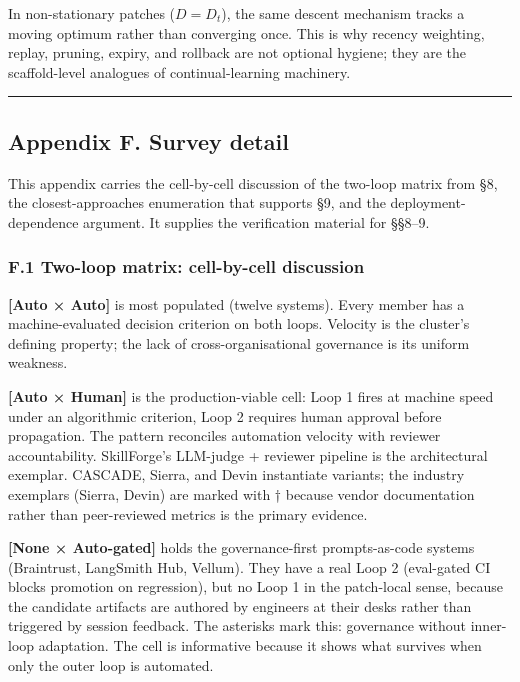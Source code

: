 In non-stationary patches (\(D = D_t\)), the same descent mechanism
tracks a moving optimum rather than converging once. This is why recency
weighting, replay, pruning, expiry, and rollback are not optional
hygiene; they are the scaffold-level analogues of continual-learning
machinery.

\begin{center}\rule{0.5\linewidth}{0.5pt}\end{center}

\subsection{Appendix F. Survey detail}\label{appendix-f.-survey-detail}

This appendix carries the cell-by-cell discussion of the two-loop matrix
from §8, the closest-approaches enumeration that supports §9, and the
deployment-dependence argument. It supplies the verification material
for §§8--9.

\subsubsection{F.1 Two-loop matrix: cell-by-cell
discussion}\label{f.1-two-loop-matrix-cell-by-cell-discussion}

\textbf{{[}Auto × Auto{]}} is most populated (twelve systems). Every
member has a machine-evaluated decision criterion on both loops.
Velocity is the cluster's defining property; the lack of
cross-organisational governance is its uniform weakness.

\textbf{{[}Auto × Human{]}} is the production-viable cell: Loop 1 fires
at machine speed under an algorithmic criterion, Loop 2 requires human
approval before propagation. The pattern reconciles automation velocity
with reviewer accountability. SkillForge's LLM-judge + reviewer pipeline
is the architectural exemplar. CASCADE, Sierra, and Devin instantiate
variants; the industry exemplars (Sierra, Devin) are marked with †
because vendor documentation rather than peer-reviewed metrics is the
primary evidence.

\textbf{{[}None × Auto-gated{]}} holds the governance-first
prompts-as-code systems (Braintrust, LangSmith Hub, Vellum). They have a
real Loop 2 (eval-gated CI blocks promotion on regression), but no Loop
1 in the patch-local sense, because the candidate artifacts are authored
by engineers at their desks rather than triggered by session feedback.
The asterisks mark this: governance without inner-loop adaptation. The
cell is informative because it shows what survives when only the outer
loop is automated.

